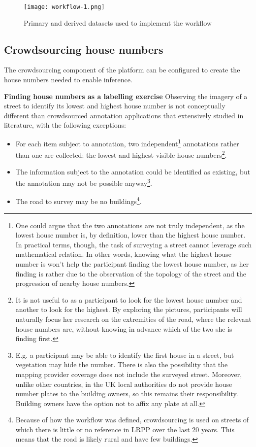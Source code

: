 \begin{figure}
	\texttt{[image: workflow-1.png]}
	\caption{Primary and derived datasets used to implement the workflow}
	\label{fig:workflow_1}
\end{figure}

\subsection{Crowdsourcing house numbers}

The crowdsourcing component of the platform can be configured to create the house numbers needed to enable inference. 

\textbf{Finding house numbers as a labelling exercise} Observing the imagery of a street to identify its lowest and highest house number is not conceptually different than crowdsourced annotation applications that extensively studied in literature, with the following exceptions:

\begin{itemize}
        
    \item For each item subject to annotation, two independent\footnote{One could argue that the two annotations are not truly independent, as the lowest house number is, by definition, lower than the highest house number. In practical terms, though, the task of surveying a street cannot leverage such mathematical relation. In other words, knowing what the highest house number is won't help the participant finding the lowest house number, as her finding is rather due to the observation of the topology of the street and the progression of nearby house numbers.} annotations rather than one are collected: the lowest and highest visible house numbers\footnote{It is not useful to as a participant to look for the lowest house number and another to look for the highest. By exploring the pictures, participants will naturally focus her research on the extremities of the road, where the relevant house numbers are, without knowing in advance which of the two she is finding first.}.
        
    \item The information subject to the annotation could be identified as existing, but the annotation may not be possible anyway\footnote{E.g. a participant may be able to identify the first house in a street, but vegetation may hide the number. There is also the possibility that the mapping provider coverage does not include the surveyed street. Moreover, unlike other countries, in the UK local authorities do not provide house number plates to the building owners, so this remains their responsibility. Building owners have the option not to affix any plate at all.}.
        
    \item The road to survey may be no buildings\footnote{Because of how the workflow was defined, crowdsourcing is used on streets of which there is little or no reference in LRPP over the last 20 years. This means that the road is likely rural and have few buildings.}.
        
\end{itemize}

